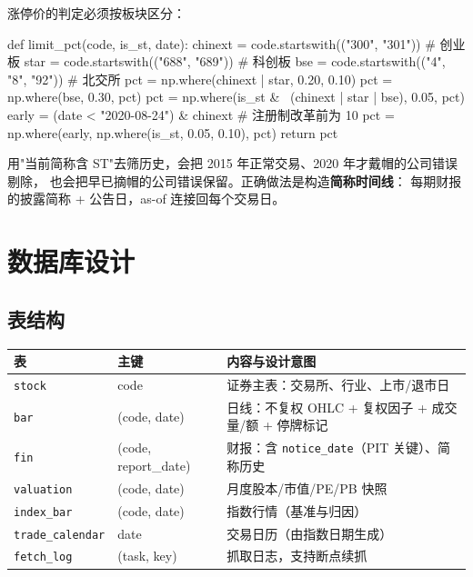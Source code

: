 涨停价的判定必须按板块区分：

\begin{pycode}[涨跌停幅度]
def limit_pct(code, is_st, date):
    chinext = code.startswith(("300", "301"))   # 创业板
    star    = code.startswith(("688", "689"))   # 科创板
    bse     = code.startswith(("4", "8", "92")) # 北交所
    pct = np.where(chinext | star, 0.20, 0.10)
    pct = np.where(bse, 0.30, pct)
    pct = np.where(is_st & ~(chinext | star | bse), 0.05, pct)
    early = (date < "2020-08-24") & chinext       # 注册制改革前为 10%
    pct = np.where(early, np.where(is_st, 0.05, 0.10), pct)
    return pct
\end{pycode}

\begin{warnbox}
用"当前简称含 ST"去筛历史，会把 2015 年正常交易、2020 年才戴帽的公司错误剔除，
也会把早已摘帽的公司错误保留。正确做法是构造\textbf{简称时间线}：
每期财报的披露简称 + 公告日，as-of 连接回每个交易日。
\end{warnbox}

\section{数据库设计}

\subsection{表结构}

\begin{center}
\begin{longtable}{@{}p{}p{}p{}@{}}
\toprule
\textbf{表} & \textbf{主键} & \textbf{内容与设计意图} \\
\midrule
\endhead
\texttt{stock} & code & 证券主表：交易所、行业、上市/退市日 \\
\texttt{bar} & (code, date) & 日线：不复权 OHLC + 复权因子 + 成交量/额 + 停牌标记 \\
\texttt{fin} & (code, report\_date) & 财报：含 \texttt{notice\_date}（PIT 关键）、简称历史 \\
\texttt{valuation} & (code, date) & 月度股本/市值/PE/PB 快照 \\
\texttt{index\_bar} & (code, date) & 指数行情（基准与归因） \\
\texttt{trade\_calendar} & date & 交易日历（由指数日期生成） \\
\texttt{fetch\_log} & (task, key) & 抓取日志，支持断点续抓 \\
\bottomrule
\end{longtable}
\end{center}

